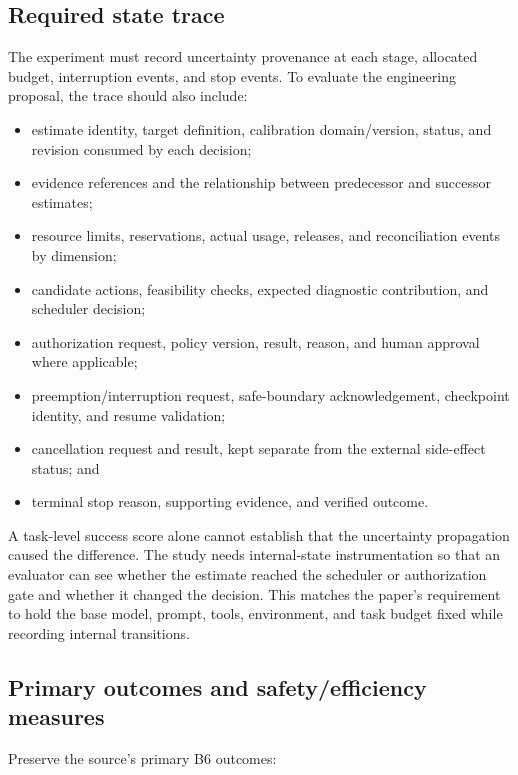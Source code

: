 \subsection{Required state trace}
\label{sec:ch16-required-trace}

The experiment must record uncertainty provenance at each stage, allocated budget, interruption events, and stop events. To evaluate the engineering proposal, the trace should also include:

\begin{itemize}
  \item estimate identity, target definition, calibration domain/version, status, and revision consumed by each decision;
  \item evidence references and the relationship between predecessor and successor estimates;
  \item resource limits, reservations, actual usage, releases, and reconciliation events by dimension;
  \item candidate actions, feasibility checks, expected diagnostic contribution, and scheduler decision;
  \item authorization request, policy version, result, reason, and human approval where applicable;
  \item preemption/interruption request, safe-boundary acknowledgement, checkpoint identity, and resume validation;
  \item cancellation request and result, kept separate from the external side-effect status; and
  \item terminal stop reason, supporting evidence, and verified outcome.
\end{itemize}

A task-level success score alone cannot establish that the uncertainty propagation caused the difference. The study needs internal-state instrumentation so that an evaluator can see whether the estimate reached the scheduler or authorization gate and whether it changed the decision. This matches the paper's requirement to hold the base model, prompt, tools, environment, and task budget fixed while recording internal transitions.

\subsection{Primary outcomes and safety/efficiency measures}
\label{sec:ch16-outcomes}

Preserve the source's primary B6 outcomes:

